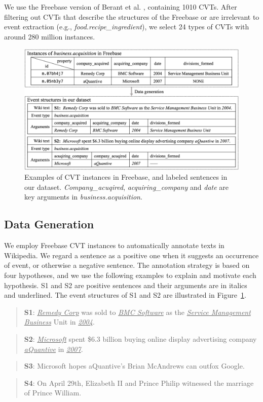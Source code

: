 \documentclass{article}
\begin{document}
We use the Freebase version of Berant et al. , containing 1010 CVTs. After filtering out CVTs that describe the structures of the Freebase or are irrelevant to event extraction (e.g., \emph{food.recipe\_ingredient}), we select 24 types of CVTs with around 280 million instances.

\begin{figure}[h]
	\centering
	\includegraphics[width=.48\textwidth]{temp}
	\caption{Examples of CVT instances in Freebase, and labeled sentences in our dataset. \emph{Company\_acuqired}, \emph{acquiring\_company} and \emph{date} are key arguments in \emph{business.acquisition}. \label{fig:3}}
\end{figure}

\subsection{Data Generation\label{datagen}}
We employ Freebase CVT instances to automatically annotate texts in Wikipedia. We regard a sentence as a positive one when it suggests an occurrence of event, or otherwise a negative sentence. The annotation strategy is based on four hypotheses, and we use the following examples to explain and motivate each hypothesis. S1 and S2 are positive sentences and their arguments are in italics and underlined. The event structures of S1 and S2 are illustrated in Figure~\ref{fig:3}.

\begin{quote}
	\textbf{S1}: \underline{\emph{Remedy Corp}} was sold to \underline{\emph{BMC Software}} as the \underline{\emph{Service Management Business}} Unit in \underline{\emph{2004}}.
\end{quote}
\begin{quote}
	\textbf{S2}: \underline{\emph{Microsoft}} spent \$6.3 billion buying online display advertising company \underline{\emph{aQuantive}} in \underline{\emph{2007}}.
\end{quote}
\begin{quote}
	\textbf{S3}: Microsoft hopes aQuantive’s Brian McAndrews can outfox Google.
\end{quote}
\begin{quote}
	\textbf{S4}: On April 29th, Elizabeth II and Prince Philip witnessed the marriage of Prince William.
\end{quote}
\end{document}
